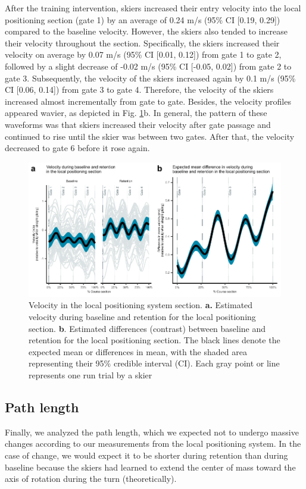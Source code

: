 \documentclass{article}
\begin{document}
After the training intervention, skiers increased their entry velocity into the local positioning section (gate 1) by an average of 0.24 m/s (95\% CI [0.19, 0.29]) compared to the baseline velocity. However, the skiers also tended to increase their velocity throughout the section. Specifically, the skiers increased their velocity on average by 0.07 m/s (95\% CI [0.01, 0.12]) from gate 1 to gate 2, followed by a slight decrease of -0.02 m/s (95\% CI [-0.05, 0.02]) from gate 2 to gate 3. Subsequently, the velocity of the skiers increased again by 0.1 m/s (95\% CI [0.06, 0.14]) from gate 3 to gate 4. Therefore, the velocity of the skiers increased almost incrementally from gate to gate. Besides, the velocity profiles appeared wavier, as depicted in Fig. \ref{fig: velocity}b. In general, the pattern of these waveforms was that skiers increased their velocity after gate passage and continued to rise until the skier was between two gates. After that, the velocity decreased to gate 6 before it rose again. 

\begin{figure}[H]
\centering
\includegraphics{figurer/figure_velocity_3.pdf}
\caption{Velocity in the local positioning system section. \textbf{a.} Estimated velocity during baseline and retention for the local positioning section. \textbf{b}. Estimated differences (contrast) between baseline and retention for the local positioning section. The black lines denote the expected mean or differences in mean, with the shaded area representing their 95\% credible interval (CI). Each gray point or line represents one run trial by a skier}\label{fig: velocity}
\end{figure}

\subsection{Path length}
Finally, we analyzed the path length, which we expected not to undergo massive changes according to our measurements from the local positioning system. In the case of change, we would expect it to be shorter during retention than during baseline because the skiers had learned to extend the center of mass toward the axis of rotation during the turn (theoretically).
\end{document}
